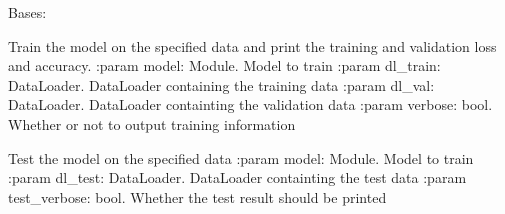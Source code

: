 \documentclass[letterpaper,10pt,english,openany,oneside]{sphinxmanual}
\begin{document}
\begin{fulllineitems}
\label{\detokenize{trainer:trainer.Trainer}}
Bases: 

\begin{fulllineitems}
\label{\detokenize{trainer:trainer.Trainer.fit}}
Train the model on the specified data and print the training and validation loss and accuracy.
:param model: Module. Model to train
:param dl\_train: DataLoader. DataLoader containing the training data
:param dl\_val: DataLoader. DataLoader containting the validation data
:param verbose: bool. Whether or not to output training information

\end{fulllineitems}


\begin{fulllineitems}
\label{\detokenize{trainer:trainer.Trainer.test}}
Test the model on the specified data
:param model: Module. Model to train
:param dl\_test: DataLoader. DataLoader containting the test data
:param test\_verbose: bool. Whether the test result should be printed

\end{fulllineitems}


\end{fulllineitems}
\end{document}
